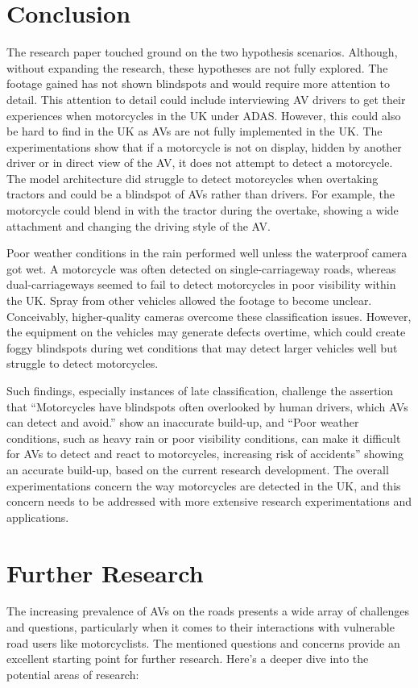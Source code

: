 \documentclass[conference]{IEEEtran}
\begin{document}
\section{Conclusion}
	The research paper touched ground on the two hypothesis scenarios. Although, without expanding the research, these hypotheses are not fully explored. The footage gained has not shown blindspots and would require more attention to detail. This attention to detail could include interviewing AV drivers to get their experiences when motorcycles in the UK under ADAS. However, this could also be hard to find in the UK as AVs are not fully implemented in the UK. The experimentations show that if a motorcycle is not on display, hidden by another driver or in direct view of the AV, it does not attempt to detect a motorcycle. The model architecture did struggle to detect motorcycles when overtaking tractors and could be a blindspot of AVs rather than drivers. For example, the motorcycle could blend in with the tractor during the overtake, showing a wide attachment and changing the driving style of the AV.

	Poor weather conditions in the rain performed well unless the waterproof camera got wet. A motorcycle was often detected on single-carriageway roads, whereas dual-carriageways seemed to fail to detect motorcycles in poor visibility within the UK. Spray from other vehicles allowed the footage to become unclear. Conceivably, higher-quality cameras overcome these classification issues. However, the equipment on the vehicles may generate defects overtime, which could create foggy blindspots during wet conditions that may detect larger vehicles well but struggle to detect motorcycles.

	Such findings, especially instances of late classification, challenge the assertion that ``Motorcycles have blindspots often overlooked by human drivers, which AVs can detect and avoid.'' show an inaccurate build-up, and ``Poor weather conditions, such as heavy rain or poor visibility conditions, can make it difficult for AVs to detect and react to motorcycles, increasing risk of accidents'' showing an accurate build-up, based on the current research development. The overall experimentations concern the way motorcycles are detected in the UK, and this concern needs to be addressed with more extensive research experimentations and applications.

\section{Further Research}
	The increasing prevalence of AVs on the roads presents a wide array of challenges and questions, particularly when it comes to their interactions with vulnerable road users like motorcyclists. The mentioned questions and concerns provide an excellent starting point for further research. Here's a deeper dive into the potential areas of research:
\end{document}
